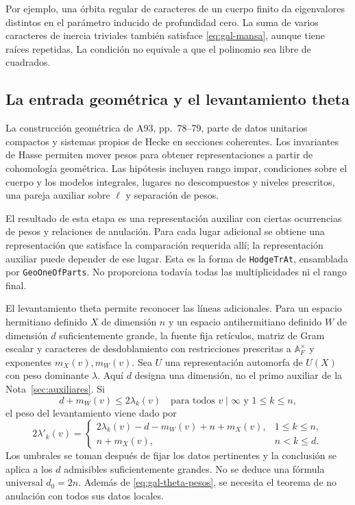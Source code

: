 Por ejemplo, una órbita regular de caracteres de un cuerpo finito
da eigenvalores distintos en el parámetro inducido de profundidad
cero. La suma de varios caracteres de inercia triviales también
satisface \eqref{eq:gal-mansa}, aunque tiene raíces repetidas.
La condición no equivale a que el polinomio sea libre de cuadrados.

\subsection{La entrada geométrica y el levantamiento theta}

La construcción geométrica de A93, pp.~78--79, parte de datos
unitarios compactos y sistemas propios de Hecke en secciones
coherentes. Los invariantes de Hasse permiten mover pesos para
obtener representaciones a partir de cohomología geométrica.
Las hipótesis incluyen rango impar, condiciones sobre el cuerpo
y los modelos integrales, lugares no descompuestos y niveles
prescritos, una pareja auxiliar sobre $\ell$ y separación de pesos.

El resultado de esta etapa es una representación auxiliar con
ciertas ocurrencias de pesos y relaciones de anulación.
Para cada lugar adicional se obtiene una representación que
satisface la comparación requerida allí; la representación
auxiliar puede depender de ese lugar. Esta es la forma de
\texttt{HodgeTrAt}, ensamblada por \texttt{GeoOneOfParts}.
No proporciona todavía todas las multiplicidades ni el rango final.

El levantamiento theta permite reconocer las líneas adicionales.
Para un espacio hermitiano definido $X$ de dimensión $n$ y un espacio
antihermitiano definido $W$ de dimensión $d$ suficientemente grande,
la fuente fija retículos, matriz de Gram escalar y caracteres
de desdoblamiento con restricciones prescritas a $\mathbb A_F^\times$
y exponentes $m_X(v),m_W(v)$. Sea $U$ una representación automorfa
de $U(X)$ con peso dominante $\lambda$.
Aquí $d$ designa una dimensión, no el primo auxiliar de la
Nota~\ref{sec:auxiliares}. Si
\[
 d+m_W(v)\le2\lambda_k(v)
       \quad\text{para todos }v\mid\infty\text{ y }1\le k\le n,
\]
el peso del levantamiento viene dado por
\begin{equation}
 2\lambda'_k(v)=
 \begin{cases}
  2\lambda_k(v)-d-m_W(v)+n+m_X(v),&1\le k\le n,\\
  n+m_X(v),&n<k\le d.
 \end{cases}
 \label{eq:gal-theta-pesos}
\end{equation}
Los umbrales se toman después de fijar los datos pertinentes
y la conclusión se aplica a los $d$ admisibles suficientemente
grandes. No se deduce una fórmula universal $d_0=2n$.
Además de \eqref{eq:gal-theta-pesos}, se necesita el teorema de
no anulación con todos sus datos locales.

